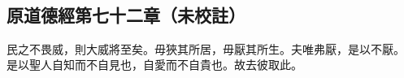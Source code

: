 ﻿%
%

\chapter{~}

\section{原道德經第七十二章（未校註）}

\begin{withgezhu}

\zhsong


民之不畏威，則大威將至矣。毋狹其所居，毋厭其所生。夫唯弗厭，是以不厭。
是以聖人自知而不自見也，自愛而不自貴也。故去彼取此。

\end{withgezhu}
